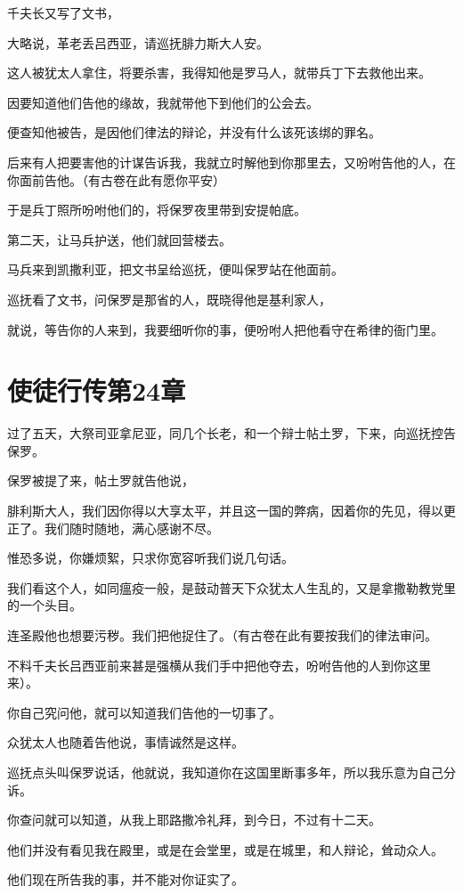 \documentclass[12pt,oneside]{book}
\begin{document}
千夫长又写了文书，

大略说，革老丢吕西亚，请巡抚腓力斯大人安。

这人被犹太人拿住，将要杀害，我得知他是罗马人，就带兵丁下去救他出来。

因要知道他们告他的缘故，我就带他下到他们的公会去。

便查知他被告，是因他们律法的辩论，并没有什么该死该绑的罪名。

后来有人把要害他的计谋告诉我，我就立时解他到你那里去，又吩咐告他的人，在你面前告他。（有古卷在此有愿你平安）

于是兵丁照所吩咐他们的，将保罗夜里带到安提帕底。

第二天，让马兵护送，他们就回营楼去。

马兵来到凯撒利亚，把文书呈给巡抚，便叫保罗站在他面前。

巡抚看了文书，问保罗是那省的人，既晓得他是基利家人，

就说，等告你的人来到，我要细听你的事，便吩咐人把他看守在希律的衙门里。

\chapter{使徒行传第24章}
过了五天，大祭司亚拿尼亚，同几个长老，和一个辩士帖土罗，下来，向巡抚控告保罗。

保罗被提了来，帖土罗就告他说，

腓利斯大人，我们因你得以大享太平，并且这一国的弊病，因着你的先见，得以更正了。我们随时随地，满心感谢不尽。

惟恐多说，你嫌烦絮，只求你宽容听我们说几句话。

我们看这个人，如同瘟疫一般，是鼓动普天下众犹太人生乱的，又是拿撒勒教党里的一个头目。

连圣殿他也想要污秽。我们把他捉住了。（有古卷在此有要按我们的律法审问。

不料千夫长吕西亚前来甚是强横从我们手中把他夺去，吩咐告他的人到你这里来）。

你自己究问他，就可以知道我们告他的一切事了。

众犹太人也随着告他说，事情诚然是这样。

巡抚点头叫保罗说话，他就说，我知道你在这国里断事多年，所以我乐意为自己分诉。

你查问就可以知道，从我上耶路撒冷礼拜，到今日，不过有十二天。

他们并没有看见我在殿里，或是在会堂里，或是在城里，和人辩论，耸动众人。

他们现在所告我的事，并不能对你证实了。
\end{document}
